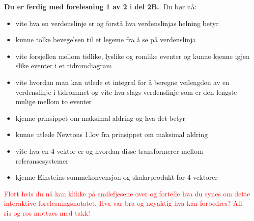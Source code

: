 \documentclass{beamer}
\let\hrefori\href
\renewcommand{\href}[2]{\textcolor{black}{{\setlength{\fboxsep}{1pt}\colorbox{sunset}{\hrefori{#1}{#2}}}}}
\newcommand{\pagebutton}[1]{\setbeamertemplate{button}{\tikz\node[inner xsep = 5pt, draw = structure!90, fill = green(ryb), rounded corners = 8pt]{\color{amber}\Large\insertbuttontext};}\beamerbutton{#1}}
\begin{document}
\begin{frame}
\label{oppsummering}
\hyperlink{vv6}{\pagebutton{\small Forrige side}}\href{https://nettskjema.no/a/171403}{ \Changey[1][yellow]{-2}}
{\bf Du er ferdig med forelesning 1 av 2 i del 2B.}. Du bør nå:
\begin{itemize}
\item vite hva en verdenslinje er og forstå hva verdenslinjas helning betyr
\item kunne tolke bevegelsen til et legeme fra å se på verdenslinja
\item vite forsjellen mellom tidlike, lyslike og romlike eventer og kunne kjenne igjen slike eventer i et tidromdiagram
\item vite hvordan man kan utlede et integral for å beregne veilengden av en verdenslinje i tidrommet og vite hva slags verdenslinje som er den lengste mulige mellom to eventer
\item kjenne prinsippet om maksimal aldring og hva det betyr
\item kunne utlede Newtons 1.lov fra prinsippet om maksimal aldring
\item vite hva en 4-vektor er og hvordan disse transformerer mellom referansesystemer
\item kjenne Einsteins summekonvensjon og skalarprodukt for 4-vektorer
\end{itemize}
\textcolor{red}{Flott hvis du nå kan klikke på smilefjesene over og fortelle hva du synes om dette interaktive forelesningsnotatet. Hva var bra og nøyaktig hva kan forbedres? All ris og ros mottaes med takk!}
\end{frame}
\end{document}
